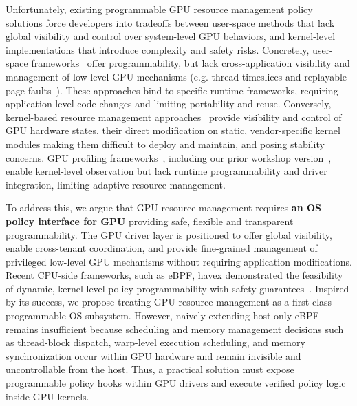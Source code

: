 Unfortunately, existing programmable GPU resource management policy solutions force developers into tradeoffs between user-space methods that lack global visibility and control over system-level GPU behaviors, and kernel-level implementations that introduce complexity and safety risks. 
Concretely, user-space frameworks~\cite{ng2023paella,shen2025xsched,gim2025pie,chen2025ktransformers} offer programmability, but lack cross-application visibility and management of low-level GPU mechanisms (e.g. thread timeslices and replayable page faults~\cite{fan2025gpreempt,nvidia-open-gpu}). These approaches bind to specific runtime frameworks, requiring application-level code changes and limiting portability and reuse. Conversely, kernel-based resource management approaches~\cite{kato2011timegraph,kato2012gdev,kernelintercept,fan2025gpreempt,wang2024gcaps} provide visibility and control of GPU hardware states, their direct modification on static, vendor-specific kernel modules making them difficult to deploy and maintain, and posing stability concerns. GPU profiling frameworks~\cite{cupti,villa2019nvbit,neutrino}, including our prior workshop version~\cite{egpu}, enable kernel-level observation but lack runtime programmability and driver integration, limiting adaptive resource management.

To address this, we argue that GPU resource management requires \textbf{an 
OS policy interface for GPU} providing safe, flexible and transparent programmability. The GPU driver layer is positioned to offer global visibility, enable cross-tenant coordination, and provide fine-grained management of privileged low-level GPU mechanisms without requiring application modifications. Recent CPU-side frameworks, such as eBPF, havex demonstrated the feasibility of dynamic, kernel-level policy programmability with safety guarantees~\cite{bachl2021flow,Zhong22,jia2023programmable,schedext-docs,zussman2025cache_ext}. Inspired by its success, we propose treating GPU resource management as a first-class programmable OS subsystem. However, naively extending host-only eBPF remains insufficient because scheduling and memory management decisions such as thread-block dispatch, warp-level execution scheduling, and memory synchronization occur within GPU hardware and remain invisible and uncontrollable from the host. Thus, a practical solution must expose programmable policy hooks within GPU drivers and execute verified policy logic inside GPU kernels.

